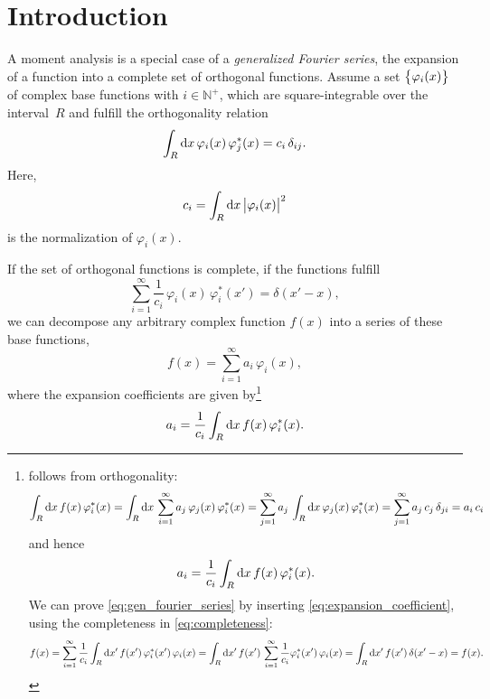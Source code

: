 \section{Introduction}%
\label{sec:introduction}

A moment analysis is a special case of a \emph{generalized Fourier
series}, \ie the expansion of a function into a complete set of
orthogonal functions.  Assume a set $\cBrk{\varphi_i(x)}$ of complex
base functions with $i \in \mathbb{N}^+$, which are square-integrable
over the interval~$R$ and fulfill the orthogonality relation
\begin{equation}
  \label{eq:orthogonality}
  \int_R \dif{x}\, \varphi_i(x)\, \varphi_j^*(x)
  = c_i\, \delta_{ij}.
\end{equation}
Here,
\begin{equation}
  \label{eq:normalization}
  c_i
  = \int_R \dif{x}\, \Abs{\varphi_i(x)}^2
\end{equation}
is the normalization of $\varphi_i(x)$.

If the set of orthogonal functions is complete, \ie if the functions
fulfill
\begin{equation}
  \label{eq:completeness}
  \sum_{i = 1}^\infty \frac{1}{c_i}\, \varphi_i(x)\, \varphi_i^*(x')
  = \delta(x' - x),
\end{equation}
we can decompose any arbitrary complex function $f(x)$ into a series
of these base functions, \ie
\begin{equation}
  \label{eq:gen_fourier_series}
  f(x)
  = \sum_{i = 1}^\infty a_i\, \varphi_i(x),
\end{equation}
where the expansion coefficients are given by\footnote{%
   follows from orthogonality:
  \begin{equation*}
    \int_R \dif{x}\, f(x)\, \varphi_i^*(x)
    = \int_R \dif{x}\, \sum_{i = 1}^\infty a_j\, \varphi_j(x)\, \varphi_i^*(x)
    = \sum_{j = 1}^\infty a_j\, \int_R \dif{x}\, \varphi_j(x)\, \varphi_i^*(x)
    = \sum_{j = 1}^\infty a_j\, c_j\, \delta_{ji} = a_i\, c_i
  \end{equation*}
  and hence
  \begin{equation*}
    a_i
    = \frac{1}{c_i} \int_R \dif{x}\, f(x)\, \varphi_i^*(x).
  \end{equation*}
  We can prove \cref{eq:gen_fourier_series} by inserting
  \cref{eq:expansion_coefficient}, using the completeness in
  \cref{eq:completeness}:
  \begin{equation*}
    f(x)
    = \sum_{i = 1}^\infty \frac{1}{c_i} \int_R \dif{x'}\, f(x')\, \varphi_i^*(x')\, \varphi_i(x)
    = \int_R \dif{x'}\, f(x')\, \sum_{i = 1}^\infty \frac{1}{c_i} \varphi_i^*(x')\, \varphi_i(x)
    = \int_R \dif{x'}\, f(x')\, \delta(x' - x) = f(x).
  \end{equation*}%
}
\begin{equation}
  \label{eq:expansion_coefficient}
  a_i
  = \frac{1}{c_i} \int_R \dif{x}\, f(x)\, \varphi_i^*(x).
\end{equation}

